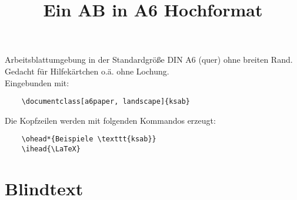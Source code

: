 \documentclass[a6paper, landscape]{ksab}
\title{Ein AB in A6 Hochformat}
\begin{document}
  \maketitle
  
  Arbeitsblattumgebung in der Standardgröße DIN A6 (quer) ohne breiten Rand. Gedacht für Hilfekärtchen o.ä. ohne Lochung.\\
  Eingebunden mit:
  \begin{verbatim}
    \documentclass[a6paper, landscape]{ksab}
  \end{verbatim}
  
  Die Kopfzeilen werden mit folgenden Kommandos erzeugt:
  \begin{verbatim}
    \ohead*{Beispiele \texttt{ksab}}
    \ihead{\LaTeX}
  \end{verbatim}
  
  \section{Blindtext}
  \blindtext
\end{document}
